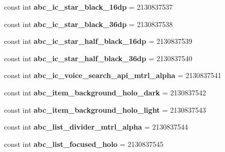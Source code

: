 \begin{DoxyCompactItemize}
\mbox{\label{classXaria_1_1Resource_1_1Drawable_ab59e823762a16a4afd5ecc012fdbf450}} 
const int {\bfseries abc\+\_\+ic\+\_\+star\+\_\+black\+\_\+16dp} = 2130837537
\item 
\mbox{\label{classXaria_1_1Resource_1_1Drawable_ab8c95e6023a9efd1f803b27dc1fe713e}} 
const int {\bfseries abc\+\_\+ic\+\_\+star\+\_\+black\+\_\+36dp} = 2130837538
\item 
\mbox{\label{classXaria_1_1Resource_1_1Drawable_a363e226053db089ea4cd729b55fe7401}} 
const int {\bfseries abc\+\_\+ic\+\_\+star\+\_\+half\+\_\+black\+\_\+16dp} = 2130837539
\item 
\mbox{\label{classXaria_1_1Resource_1_1Drawable_abbd9f204570145d7f68a2b6ddbe9c287}} 
const int {\bfseries abc\+\_\+ic\+\_\+star\+\_\+half\+\_\+black\+\_\+36dp} = 2130837540
\item 
\mbox{\label{classXaria_1_1Resource_1_1Drawable_a54684f72016974ff1c3fba4bd7c8f471}} 
const int {\bfseries abc\+\_\+ic\+\_\+voice\+\_\+search\+\_\+api\+\_\+mtrl\+\_\+alpha} = 2130837541
\item 
\mbox{\label{classXaria_1_1Resource_1_1Drawable_ad7d94b414d7438e4b4c6ec456deee3b6}} 
const int {\bfseries abc\+\_\+item\+\_\+background\+\_\+holo\+\_\+dark} = 2130837542
\item 
\mbox{\label{classXaria_1_1Resource_1_1Drawable_ad9d7ed691f27be08118bb31227c48c49}} 
const int {\bfseries abc\+\_\+item\+\_\+background\+\_\+holo\+\_\+light} = 2130837543
\item 
\mbox{\label{classXaria_1_1Resource_1_1Drawable_a2dd2dff529603534069ca127a8373dc8}} 
const int {\bfseries abc\+\_\+list\+\_\+divider\+\_\+mtrl\+\_\+alpha} = 2130837544
\item 
\mbox{\label{classXaria_1_1Resource_1_1Drawable_a8979f58a744384e1c6b5d9e4f442eb99}} 
const int {\bfseries abc\+\_\+list\+\_\+focused\+\_\+holo} = 2130837545

\end{DoxyCompactItemize}
